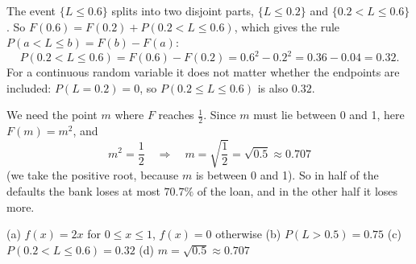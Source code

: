 \begin{solution}
	 The event $\{L\le0.6\}$ splits into two disjoint parts,
	$\{L\le0.2\}$ and $\{0.2<L\le0.6\}$. So $F(0.6)=F(0.2)+P(0.2<L\le0.6)$,
	which gives the rule $P(a<L\le b)=F(b)-F(a)$:
	\[ P(0.2<L\le0.6)=F(0.6)-F(0.2)=0.6^2-0.2^2=0.36-0.04=0.32. \]
	For a continuous random variable it does not matter whether the endpoints
	are included: $P(L=0.2)=0$, so $P(0.2\le L\le0.6)$ is also $0.32$.

	 We need the point $m$ where $F$ reaches $\frac12$. Since $m$
	must lie between 0 and 1, here $F(m)=m^2$, and
	\[ m^2=\frac12 \quad\Longrightarrow\quad m=\sqrt{\frac12}=\sqrt{0.5}\approx0.707 \]
	(we take the positive root, because $m$ is between 0 and 1). So in half of
	the defaults the bank loses at most $70.7\%$ of the loan, and in the other
	half it loses more.
	\begin{answer}
		(a) $f(x)=2x$ for $0\le x\le1$, $f(x)=0$ otherwise
		\quad (b) $P(L>0.5)=0.75$
		\quad (c) $P(0.2<L\le0.6)=0.32$
		\quad (d) $m=\sqrt{0.5}\approx0.707$
	\end{answer}
\end{solution}
